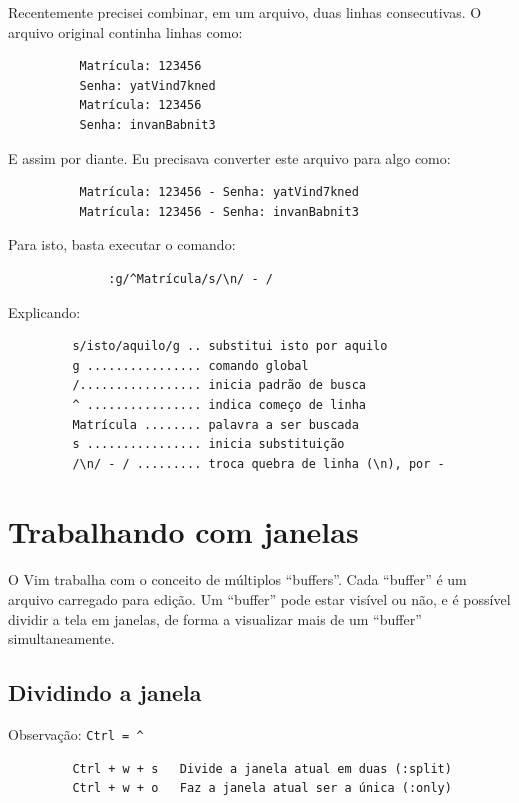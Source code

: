 \documentclass[10pt,a4paper,openany]{book}
\begin{document}
Recentemente precisei combinar, em um arquivo, duas linhas
consecutivas. O arquivo original continha linhas como:

\begin{verbatim}
		  Matrícula: 123456
		  Senha: yatVind7kned
		  Matrícula: 123456
		  Senha: invanBabnit3
\end{verbatim}

E assim por diante. Eu precisava converter este arquivo para algo como:

\begin{verbatim}
		  Matrícula: 123456 - Senha: yatVind7kned
		  Matrícula: 123456 - Senha: invanBabnit3
\end{verbatim}

Para isto, basta executar o comando:

\begin{verbatim}
			  :g/^Matrícula/s/\n/ - /
\end{verbatim}

Explicando:

\begin{verbatim}
		 s/isto/aquilo/g .. substitui isto por aquilo
		 g ................ comando global
		 /................. inicia padrão de busca
		 ^ ................ indica começo de linha
		 Matrícula ........ palavra a ser buscada
		 s ................ inicia substituição
		 /\n/ - / ......... troca quebra de linha (\n), por -
\end{verbatim}

\chapter{Trabalhando com janelas}\label{cha:Trabalhando com janelas}

O Vim trabalha com o conceito de múltiplos ``buffers''. Cada
``buffer'' é um arquivo carregado para edição. Um ``buffer'' pode
estar visível ou não, e é possível dividir a tela em janelas, de forma
a visualizar mais de um ``buffer'' simultaneamente.

\section{Dividindo a janela }
Observação: \verb+Ctrl = ^+

\begin{verbatim}
		 Ctrl + w + s   Divide a janela atual em duas (:split)
		 Ctrl + w + o   Faz a janela atual ser a única (:only)
\end{verbatim}
\end{document}
